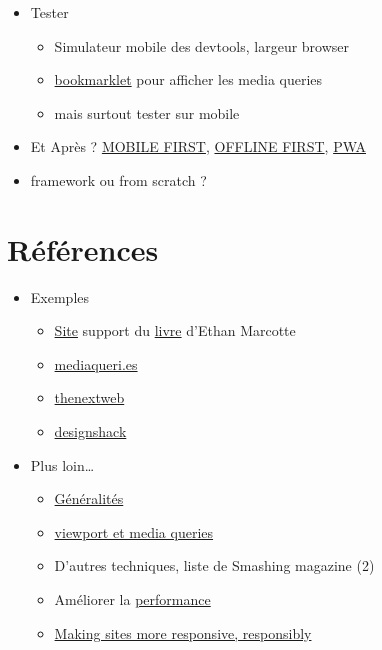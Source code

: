 \begin{itemize}
\tightlist
\item
  Tester

  \begin{itemize}
  \tightlist
  \item
    Simulateur mobile des devtools, largeur browser
  \item
    \href{https://seesparkbox.com/foundry/media_query_bookmarklet}{bookmarklet}
    pour afficher les media queries
  \item
    mais surtout tester sur mobile
  \end{itemize}
\item
  Et Après ?
  \href{http://www.lukew.com/resources/mobile_first.asp}{MOBILE FIRST},
  \href{http://offlinefirst.org/}{OFFLINE FIRST},
  \href{https://developers.google.com/web/progressive-web-apps/}{PWA}
\item
  framework ou from scratch ?
\end{itemize}

\hypertarget{ruxe9fuxe9rences}{%
\section{Références}\label{ruxe9fuxe9rences}}

\begin{itemize}
\tightlist
\item
  Exemples

  \begin{itemize}
  \tightlist
  \item
    \href{http://responsivewebdesign.com/robot/}{Site} support du
    \href{https://abookapart.com/products/responsive-web-design}{livre}
    d'Ethan Marcotte
  \item
    \href{http://mediaqueri.es/}{mediaqueri.es}
  \item
    \href{http://thenextweb.com/dd/2013/01/13/30-new-inspiring-responsive-design-websites/}{thenextweb}
  \item
    \href{https://designshack.net/articles/css/20-amazing-examples-of-using-media-queries-for-responsive-web-design/}{designshack}
  \end{itemize}
\item
  Plus loin\ldots{}

  \begin{itemize}
  \tightlist
  \item
    \href{http://johnpolacek.github.io/scrolldeck.js/decks/responsive/}{Généralités}
  \item
    \href{http://www.quirksmode.org/blog/archives/2010/09/combining_meta.html}{viewport
    et media queries}
  \item
    D'autres techniques, liste de Smashing magazine (2)
  \item
    Améliorer la
    \href{http://csswizardry.com/2013/01/front-end-performance-for-web-designers-and-front-end-developers/}{performance}
  \item
    \href{https://24ways.org/2014/making-sites-more-responsive-responsibly/}{Making
    sites more responsive, responsibly}
  \end{itemize}
\end{itemize}

